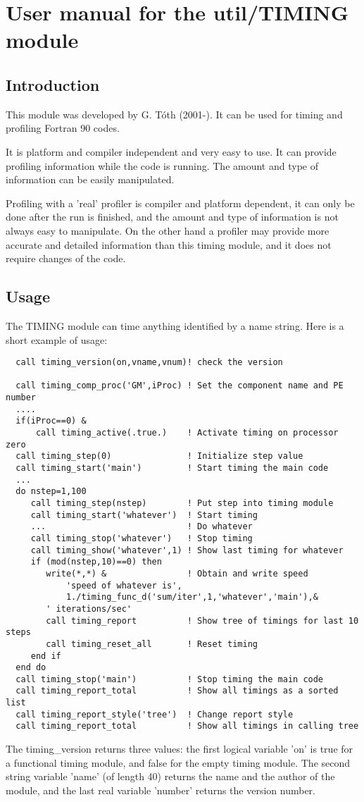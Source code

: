 \section{User manual for the util/TIMING module}

\subsection{Introduction}

This module was developed by G. T\'oth (2001-).
It can be used for timing and profiling Fortran 90 codes.

It is platform and compiler independent and very easy to use.
It can provide profiling information while the code is running.
The amount and type of information can be easily manipulated.

Profiling with a 'real' profiler is compiler and platform dependent, 
it can only be done after the run is finished, and the amount and
type of information is not always easy to manipulate. On the other hand
a profiler may provide more accurate and detailed information than 
this timing module, and it does not require changes of the code.

\subsection{Usage}

The TIMING module can time anything identified by a name string.
Here is a short example of usage:
{\footnotesize
\begin{verbatim}
  call timing_version(on,vname,vnum)! check the version

  call timing_comp_proc('GM',iProc) ! Set the component name and PE number
  ....
  if(iProc==0) &
      call timing_active(.true.)    ! Activate timing on processor zero
  call timing_step(0)               ! Initialize step value
  call timing_start('main')         ! Start timing the main code
  ...
  do nstep=1,100
     call timing_step(nstep)        ! Put step into timing module
     call timing_start('whatever')  ! Start timing
     ...                            ! Do whatever
     call timing_stop('whatever')   ! Stop timing
     call timing_show('whatever',1) ! Show last timing for whatever 
     if (mod(nstep,10)==0) then
        write(*,*) &                ! Obtain and write speed
            'speed of whatever is',
            1./timing_func_d('sum/iter',1,'whatever','main'),&
	    ' iterations/sec'
        call timing_report          ! Show tree of timings for last 10 steps
        call timing_reset_all       ! Reset timing
     end if
  end do
  call timing_stop('main')          ! Stop timing the main code
  call timing_report_total          ! Show all timings as a sorted list
  call timing_report_style('tree')  ! Change report style
  call timing_report_total          ! Show all timings in calling tree
\end{verbatim}
}
The timing\_version returns three values: the first logical variable
'on' is true for a functional timing module, and false for
the empty timing module. The second string variable 'name' (of length 40)
returns the name and the author of the module, and the last real variable
'number' returns the version number. 

